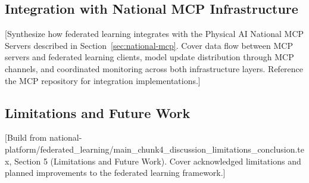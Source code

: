 \subsection{Integration with National MCP Infrastructure}
\label{subsec:fl-mcp-integration}

[Synthesize how federated learning integrates with the Physical AI National
MCP Servers \cite{national-mcp-paper} described in Section~\ref{sec:national-mcp}.
Cover data flow between MCP servers and federated learning clients, model
update distribution through MCP channels, and coordinated monitoring across
both infrastructure layers. Reference the MCP repository \cite{mcp-repo} for
integration implementations.]

\subsection{Limitations and Future Work}
\label{subsec:fl-limitations}

[Build from national-platform/federated\_learning/main\_chunk4\_discussion\_limitations\_conclusion.tex,
Section 5 (Limitations and Future Work). Cover acknowledged limitations and
planned improvements to the federated learning framework.]
